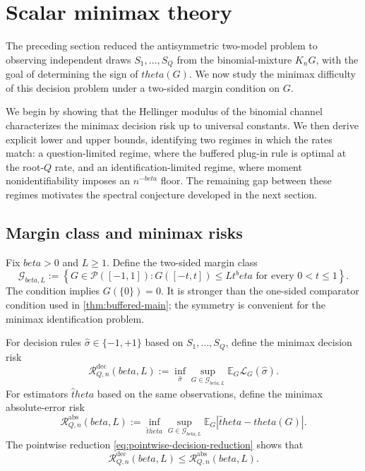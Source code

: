 \documentclass[11pt]{article}
\def\beta{beta}%
\def\theta{theta}%
\newcommand{\E}{\mathbb E}
\newcommand{\calG}{\mathcal G}
\newcommand{\calR}{\mathcal R}
\newcommand\aed[1]{{\color{magenta!60!black} #1}}
\newcommand\ced[1]{{\color{teal!70!black} #1}}
\newcommand\eed[1]{{\color{green!45!black} #1}}
\begin{document}
\section{Scalar minimax theory}
\label{sec:scalar-minimax}

\eed{The preceding section reduced the antisymmetric two-model problem to observing \aed{independent draws} $S_1,\dots,S_Q$ %
from the binomial-mixture %
$K_nG$, with the goal of determining the sign of $\theta(G)$.  We now study the minimax difficulty of this decision problem under a two-sided margin condition on $G$.

We begin by showing that the Hellinger modulus of the binomial channel characterizes the minimax decision risk up to universal constants.  We then derive explicit lower and upper bounds, identifying two regimes in which the rates match: a question-limited regime, where the buffered plug-in rule is optimal at the root-$Q$ rate, and an identification-limited regime, where moment nonidentifiability imposes an $n^{-\beta}$ floor.  The remaining gap between these regimes motivates the spectral conjecture developed in the next section.}

\subsection{Margin class and minimax risks}

Fix $\beta>0$ and $L\ge1$.  Define the two-sided margin class
\begin{equation}
\label{eq:Gclass}
\calG_{\beta,L}
:=
\left\{
G\in\mathcal P([-1,1]):
G([-t,t])\le Lt^\beta
\text{ for every }0<t\le1
\right\}.
\end{equation}
The condition implies $G(\{0\})=0$.  It is stronger than the one-sided comparator condition used in \cref{thm:buffered-main}; the symmetry is convenient for the minimax identification problem.

For decision rules $\widehat\sigma\in\{-1,+1\}$ based on $S_1,\dots,S_Q$, define the minimax decision risk
\begin{equation}
\label{eq:minimax-decision}
\calR^{\mathrm{dec}}_{Q,n}(\beta,L)
:=
\inf_{\widehat\sigma}
\sup_{G\in\calG_{\beta,L}}
\E_G\mathcal L_G(\widehat\sigma).
\end{equation}
For estimators $\widehat\theta$ based on the same observations, define the minimax absolute-error risk
\[
\calR^{\mathrm{abs}}_{Q,n}(\beta,L)
:=
\inf_{\widehat\theta}
\sup_{G\in\calG_{\beta,L}}
\E_G|\widehat\theta-\theta(G)|.
\]
\ced{The pointwise reduction \eqref{eq:pointwise-decision-reduction} shows that}
\begin{equation}
\label{eq:dec-le-abs}
\calR^{\mathrm{dec}}_{Q,n}(\beta,L)
\le
\calR^{\mathrm{abs}}_{Q,n}(\beta,L).
\end{equation}
\end{document}
